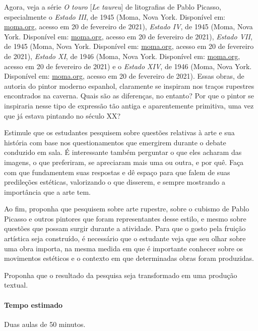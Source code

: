 \documentclass[12pt]{extarticle}
\begin{document}
Agora, veja a série \emph{O touro} {[}\emph{Le taureu}{]} de
  litografias de Pablo Picasso, especialmente o \emph{Estado III}, de
  1945 (Moma, Nova York. Disponível em:
  \href{https://www.moma.org/collection/works/62951}{moma.org},
  acesso em 20 de fevereiro de 2021), \emph{Estado IV}, de 1945 (Moma,
  Nova York. Disponível em:
  \href{https://www.moma.org/collection/works/62968}{moma.org},
  acesso em 20 de fevereiro de 2021), \emph{Estado VII}, de 1945 (Moma,
  Nova York. Disponível em:
  \href{https://www.moma.org/collection/works/62986}{moma.org},
  acesso em 20 de fevereiro de 2021), \emph{Estado XI}, de 1946 (Moma,
  Nova York. Disponível em:
  \href{https://www.moma.org/collection/works/63046}{moma.org},
  acesso em 20 de fevereiro de 2021) e o \emph{Estado XIV}, de 1946
  (Moma, Nova York. Disponível em:
  \href{https://www.moma.org/collection/works/65356}{moma.org},
  acesso em 20 de fevereiro de 2021). Essas obras, de autoria do pintor
  moderno espanhol, claramente se inspiram nos traços rupestres
  encontrados na caverna. Quais são as diferenças, no entanto? Por que o
  pintor se inspiraria nesse tipo de expressão tão antiga e
  aparentemente primitiva, uma vez que já estava pintando no século XX?

  Estimule que os estudantes pesquisem sobre questões relativas à arte e
  sua história com base nos questionamentos que emergirem durante o
  debate conduzido em sala. É interessante também perguntar o que eles
  acharam das imagens, o que preferiram, se apreciaram mais uma ou
  outra, e por quê. Faça com que fundamentem suas respostas e dê espaço
  para que falem de suas predileções estéticas, valorizando o que
  disserem, e sempre mostrando a importância que a arte tem.

  Ao fim, proponha que pesquisem sobre arte rupestre, sobre o cubismo de
  Pablo Picasso e outros pintores que foram representantes desse estilo,
  e mesmo sobre questões que possam surgir durante a atividade. Para que
  o gosto pela fruição artística seja construído, é necessário que o
  estudante veja que seu olhar sobre uma obra importa, na mesma medida
  em que é importante conhecer sobre os movimentos estéticos e o
  contexto em que determinadas obras foram produzidas.

  Proponha que o resultado da pesquisa seja transformado em uma produção
  textual.

\paragraph{Tempo estimado} Duas aulas de 50 minutos.
\end{document}
